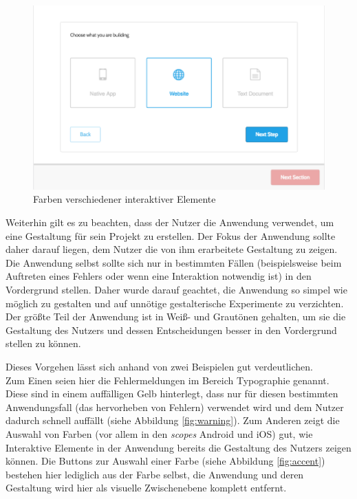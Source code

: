 \begin{figure}[h]
    \centering
    \includegraphics[width=1\textwidth]{images/25knots_entrance.png}
    \caption{Farben verschiedener interaktiver Elemente}
    \label{fig:entrance}
\end{figure}

Weiterhin gilt es zu beachten, dass der Nutzer die Anwendung verwendet, um eine Gestaltung für sein Projekt zu erstellen. Der Fokus der Anwendung sollte daher darauf liegen, dem Nutzer die von ihm erarbeitete Gestaltung zu zeigen. Die Anwendung selbst sollte sich nur in bestimmten Fällen (beispielsweise beim Auftreten eines Fehlers oder wenn eine Interaktion notwendig ist) in den Vordergrund stellen. Daher wurde darauf geachtet, die Anwendung so simpel wie möglich zu gestalten und auf unnötige gestalterische Experimente zu verzichten. Der größte Teil der Anwendung ist in Weiß- und Grautönen gehalten, um sie die Gestaltung des Nutzers und dessen Entscheidungen besser in den Vordergrund stellen zu können.

Dieses Vorgehen lässt sich anhand von zwei Beispielen gut verdeutlichen.\\
Zum Einen seien hier die Fehlermeldungen im Bereich Typographie genannt. Diese sind in einem auffälligen Gelb hinterlegt, dass nur für diesen bestimmten Anwendungsfall (das hervorheben von Fehlern) verwendet wird und dem Nutzer dadurch schnell auffällt (siehe Abbildung \ref{fig:warning}).
Zum Anderen zeigt die Auswahl von Farben (vor allem in den \textit{scopes} Android und iOS) gut, wie Interaktive Elemente in der Anwendung bereits die Gestaltung des Nutzers zeigen können. Die Buttons zur Auswahl einer Farbe (siehe Abbildung \ref{fig:accent}) bestehen hier lediglich aus der Farbe selbst, die Anwendung und deren Gestaltung wird hier als visuelle Zwischenebene komplett entfernt.

